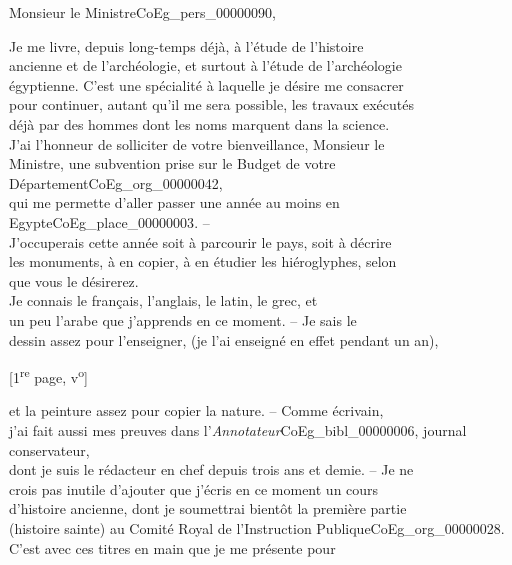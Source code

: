 \documentclass{book}
\begin{document}
\hspace{1cm} Monsieur le Ministre\gls{CoEg_pers_00000090},\\
\par Je me livre, depuis long-temps déjà, à l’étude de l’histoire\\
ancienne et de l’archéologie, et surtout à l’étude de l’archéologie\\
égyptienne. C’est une spécialité à laquelle je désire me consacrer\\
pour continuer, autant qu’il me sera possible, les travaux exécutés\\
déjà par des hommes dont les noms marquent dans la science.\\
\indent J’ai l’honneur de solliciter de votre bienveillance, Monsieur le\\
Ministre, une subvention prise sur le Budget de votre Département\gls{CoEg_org_00000042},\\
qui me permette d’aller passer une année au moins en Egypte\gls{CoEg_place_00000003}. –\\
J’occuperais cette année soit à parcourir le pays, soit à décrire\\
les monuments, à en copier, à en étudier les hiéroglyphes, selon\\
que vous le désirerez.\\
\indent Je connais le français, l’anglais, le latin, le grec, et\\
un peu l’arabe que j’apprends en ce moment. – Je sais le\\
dessin assez pour l’enseigner, (je l’ai enseigné en effet pendant un an),\\
{\footnotesize \begin{center} {[1\textsuperscript{re} page, v\textsuperscript{o}]}\end{center}}
\noindent et la peinture assez pour copier la nature. – Comme écrivain,\\
j’ai fait aussi mes preuves dans l’\textit{Annotateur}\gls{CoEg_bibl_00000006}, journal conservateur,\\
dont je suis le rédacteur en chef depuis trois ans et demie. – Je ne\\
crois pas inutile d’ajouter que j’écris en ce moment un cours\\
d’histoire ancienne, dont je soumettrai bientôt la première partie\\
(histoire sainte) au Comité Royal de l’Instruction Publique\gls{CoEg_org_00000028}.\\
\indent C’est avec ces titres en main que je me présente pour\\
\end{document}
